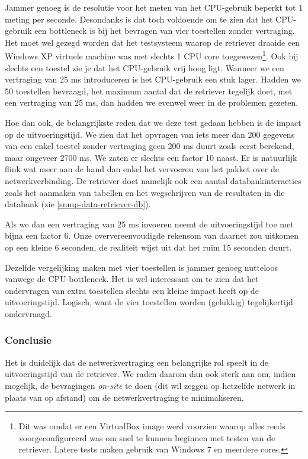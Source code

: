 Jammer genoeg is de resolutie voor het meten van het CPU-gebruik beperkt tot 1 meting per seconde.
Desondanks is dat toch voldoende om te zien dat het CPU-gebruik een bottleneck is bij het bevragen van vier toestellen zonder vertraging.
Het moet wel gezegd worden dat het testsysteem waarop de retriever draaide een Windows XP virtuele machine was met slechts 1 CPU core toegewezen\footnote{
	Dit was omdat er een VirtualBox image werd voorzien waarop alles reeds voorgeconfigureerd was om snel te kunnen beginnen met testen van de retriever.
	Latere tests maken gebruik van Windows 7 en meerdere cores.
}.
Ook bij slechts een toestel zie je dat het CPU-gebruik vrij hoog ligt.
Wanneer we een vertraging van 25 ms introduceren is het CPU-gebruik een stuk lager.
Hadden we 50 toestellen bevraagd, het maximum aantal dat de retriever tegelijk doet, met een vertraging van 25 ms, dan hadden we evenwel weer in de problemen gezeten.

Hoe dan ook, de belangrijkste reden dat we deze test gedaan hebben is de impact op de uitvoeringstijd.
We zien dat het opvragen van iets meer dan 200 gegevens van een enkel toestel zonder vertraging geen 200 ms duurt zoals eerst berekend,
maar ongeveer 2700 ms.
We zaten er slechts een factor 10 naast.
Er is natuurlijk flink wat meer aan de hand dan enkel het vervoeren van het pakket over de netwerkverbinding.
De retriever doet namelijk ook een aantal databankinteracties zoals het aanmaken van tabellen en
het wegschrijven van de resultaten in die databank (zie \cref{snmp-data-retriever-db}).

Als we dan een vertraging van 25 ms invoeren neemt de uitvoeringstijd toe met bijna een factor 6.
Onze oververeenvoudigde rekensom van daarnet zou uitkomen op een kleine 6 seconden, de realiteit wijst uit dat het ruim 15 seconden duurt.

Dezelfde vergelijking maken met vier toestellen is jammer genoeg nutteloos vanwege de CPU-bottleneck.
Het is wel interessant om te zien dat het ondervragen van extra toestellen slechts een kleine impact heeft op de uitvoeringstijd.
Logisch, want de vier toestellen worden (gelukkig) tegelijkertijd ondervraagd.


\subsubsection{Conclusie}

Het is duidelijk dat de netwerkvertraging een belangrijke rol speelt in de uitvoeringstijd van de retriever.
We raden daarom dan ook sterk aan om, indien mogelijk, de bevragingen \textit{on-site} te doen
(dit wil zeggen op hetzelfde netwerk in plaats van op afstand) om de netwerkvertraging te minimaliseren.

